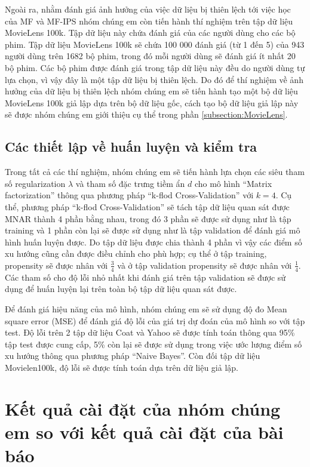 Ngoài ra, nhằm đánh giá ảnh hưởng của việc dữ liệu bị thiên lệch tới việc học của MF và MF-IPS nhóm chúng em còn tiến hành thí nghiệm trên tập dữ liệu MovieLens 100k. Tập dữ liệu này chứa đánh giá của các người dùng cho các bộ phim. Tập dữ liệu MovieLens 100k sẽ chứa 100 000 đánh giá (từ 1 đến 5) của 943 người dùng trên 1682 bộ phim, trong đó mỗi người dùng sẽ đánh giá ít nhất 20 bộ phim. Các bộ phim được đánh giá trong tập dữ liệu này đều do người dùng tự lựa chọn, vì vậy đây là một tập dữ liệu bị thiên lệch. Do đó để thí nghiệm về ảnh hưởng của dữ liệu bị thiên lệch nhóm chúng em sẽ tiến hành tạo một bộ dữ liệu MovieLens 100k giả lập dựa trên bộ dữ liệu gốc, cách tạo bộ dữ liệu giả lập này sẽ được nhóm chúng em giới thiệu cụ thể trong phần \ref{subsection:MovieLens}.

\subsection{Các thiết lập về huấn luyện và kiểm tra}
Trong tất cả các thí nghiệm, nhóm chúng em sẽ tiến hành lựa chọn các siêu tham số regularization $\lambda$ và tham số đặc trưng tiềm ẩn $d$ cho mô hình ``Matrix factorization'' thông qua phương pháp ``k-flod Cross-Validation'' với $k=4$. Cụ thể, phương pháp ``k-flod Cross-Validation'' sẽ tách tập dữ liệu quan sát được MNAR thành 4 phần bằng nhau, trong đó 3 phần sẽ được sử dụng như là tập training và 1 phần còn lại sẽ được sử dụng như là tập validation để đánh giá mô hình huấn luyện được. Do tập dữ liệu được chia thành 4 phần vì vậy các điểm số xu hướng cũng cần được điều chỉnh cho phù hợp; cụ thể ở tập training, propensity sẽ được nhân với $\frac{3}{4}$ và ở tập validation propensity sẽ được nhân với $\frac{1}{4}$. Các tham số cho độ lỗi nhỏ nhất khi đánh giá trên tập validation sẽ được sử dụng để huấn luyện lại trên toàn bộ tập dữ liệu quan sát được. 

Để đánh giá hiệu năng của mô hình, nhóm chúng em sẽ sử dụng độ đo Mean square error (MSE) để đánh giá độ lỗi của giá trị dự đoán của mô hình so với tập test. Độ lỗi trên 2 tập dữ liệu Coat và Yahoo sẽ được tính toán thông qua 95\% tập test được cung cấp, 5\% còn lại sẽ được sử dụng trong việc ước lượng điểm số xu hướng thông qua phương pháp ``Naive Bayes''. Còn đối tập dữ liệu Movielen100k, độ lỗi sẽ được tính toán dựa trên dữ liệu giả lập.


\section{Kết quả cài đặt của nhóm chúng em so với kết quả cài đặt của bài báo}



